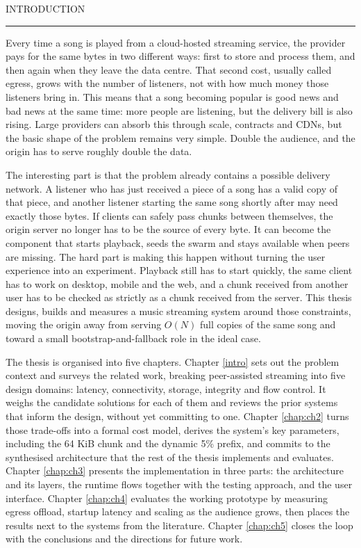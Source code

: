 \documentclass[12pt]{report}
\begin{document}
\tableofcontents


\cleardoublepage
\markboth{}{}
INTRODUCTION
\vspace{0.5cm}
\hrule
\vspace{0.5cm}

Every time a song is played from a cloud-hosted streaming service, the provider pays for the same bytes in two different ways: first to store and process them, and then again when they leave the data centre. That second cost, usually called egress, grows with the number of listeners, not with how much money those listeners bring in. This means that a song becoming popular is good news and bad news at the same time: more people are listening, but the delivery bill is also rising. Large providers can absorb this through scale, contracts and CDNs, but the basic shape of the problem remains very simple. Double the audience, and the origin has to serve roughly double the data.

\par The interesting part is that the problem already contains a possible delivery network. A listener who has just received a piece of a song has a valid copy of that piece, and another listener starting the same song shortly after may need exactly those bytes. If clients can safely pass chunks between themselves, the origin server no longer has to be the source of every byte. It can become the component that starts playback, seeds the swarm and stays available when peers are missing. The hard part is making this happen without turning the user experience into an experiment. Playback still has to start quickly, the same client has to work on desktop, mobile and the web, and a chunk received from another user has to be checked as strictly as a chunk received from the server. This thesis designs, builds and measures a music streaming system around those constraints, moving the origin away from serving $O(N)$ full copies of the same song and toward a small bootstrap-and-fallback role in the ideal case.

\par The thesis is organised into five chapters. Chapter \ref{intro} sets out the problem context and surveys the related work, breaking peer-assisted streaming into five design domains: latency, connectivity, storage, integrity and flow control. It weighs the candidate solutions for each of them and reviews the prior systems that inform the design, without yet committing to one. Chapter \ref{chap:ch2} turns those trade-offs into a formal cost model, derives the system's key parameters, including the 64 KiB chunk and the dynamic 5\% prefix, and commits to the synthesised architecture that the rest of the thesis implements and evaluates. Chapter \ref{chap:ch3} presents the implementation in three parts: the architecture and its layers, the runtime flows together with the testing approach, and the user interface. Chapter \ref{chap:ch4} evaluates the working prototype by measuring egress offload, startup latency and scaling as the audience grows, then places the results next to the systems from the literature. Chapter \ref{chap:ch5} closes the loop with the conclusions and the directions for future work.
\end{document}
